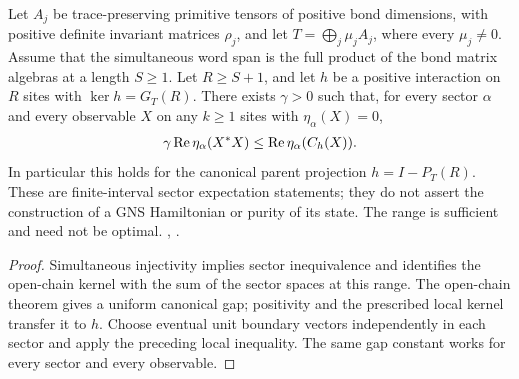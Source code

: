 \begin{lemma}
    \label{thm:multiblock_local_parent_commutator_gap}
    \leanok
    Let $A_j$ be trace-preserving primitive tensors of positive bond
    dimensions, with positive definite invariant matrices $\rho_j$,
    and let $T=\bigoplus_j\mu_jA_j$, where every $\mu_j\neq0$.
    Assume that the simultaneous word span is the full product of the bond
    matrix algebras at a length $S\geq1$. Let $R\geq S+1$, and let $h$ be
    a positive interaction on $R$ sites with $\ker h=G_T(R)$.
    There exists $\gamma>0$ such that, for every sector $\alpha$ and every
    observable $X$ on any $k\geq1$ sites with $\eta_\alpha(X)=0$,
    \begin{align}
        \gamma\operatorname{Re}\eta_\alpha(X^*X)
        \leq\operatorname{Re}\eta_\alpha(C_h(X)).
        \notag
    \end{align}
    In particular this holds for the canonical parent projection
    $h=I-P_T(R)$. These are finite-interval sector expectation statements;
    they do not assert the construction of a GNS Hamiltonian or purity of
    its state. The range is sufficient and need not be optimal.
    \cite[Theorem~1.2 and Section~6]{Nachtergaele1996Spectral},
    \cite{gap:nachtergaele96_infinite_volume_ground_projection}.
\end{lemma}
\begin{proof}\leanok
    Simultaneous injectivity implies sector inequivalence and identifies
    the open-chain kernel with the sum of the sector spaces at this range.
    The open-chain theorem gives a uniform canonical gap; positivity
    and the prescribed local kernel transfer it to $h$.
    Choose eventual unit boundary vectors independently in each sector
    and apply the preceding local inequality. The same gap constant works
    for every sector and every observable.
\end{proof}

